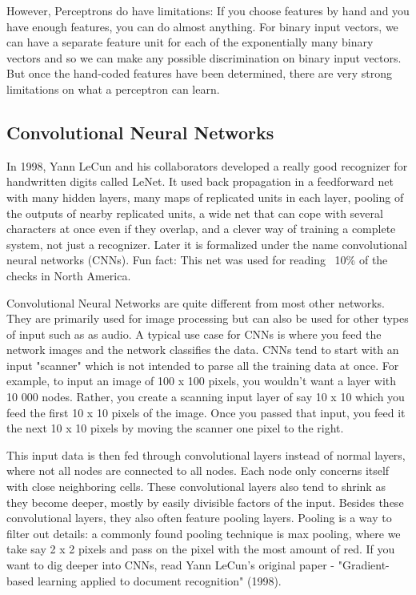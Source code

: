 However, Perceptrons do have limitations: If you choose features by hand and you have enough features, you can do almost anything. For binary input vectors, we can have a separate feature unit for each of the exponentially many binary vectors and so we can make any possible discrimination on binary input vectors. But once the hand-coded features have been determined, there are very strong limitations on what a perceptron can learn.
 
\subsection{Convolutional Neural Networks}

In 1998, Yann LeCun and his collaborators developed a really good recognizer for handwritten digits called LeNet. It used back propagation in a feedforward net with many hidden layers, many maps of replicated units in each layer, pooling of the outputs of nearby replicated units, a wide net that can cope with several characters at once even if they overlap, and a clever way of training a complete system, not just a recognizer. Later it is formalized under the name convolutional neural networks (CNNs). Fun fact: This net was used for reading ~10\% of the checks in North America.


Convolutional Neural Networks are quite different from most other networks. They are primarily used for image processing but can also be used for other types of input such as as audio. A typical use case for CNNs is where you feed the network images and the network classifies the data. CNNs tend to start with an input "scanner" which is not intended to parse all the training data at once. For example, to input an image of 100 x 100 pixels, you wouldn't want a layer with 10 000 nodes. Rather, you create a scanning input layer of say 10 x 10 which you feed the first 10 x 10 pixels of the image. Once you passed that input, you feed it the next 10 x 10 pixels by moving the scanner one pixel to the right.


This input data is then fed through convolutional layers instead of normal layers, where not all nodes are connected to all nodes. Each node only concerns itself with close neighboring cells. These convolutional layers also tend to shrink as they become deeper, mostly by easily divisible factors of the input. Besides these convolutional layers, they also often feature pooling layers. Pooling is a way to filter out details: a commonly found pooling technique is max pooling, where we take say 2 x 2 pixels and pass on the pixel with the most amount of red. If you want to dig deeper into CNNs, read Yann LeCun's original paper - "Gradient-based learning applied to document recognition" (1998).

